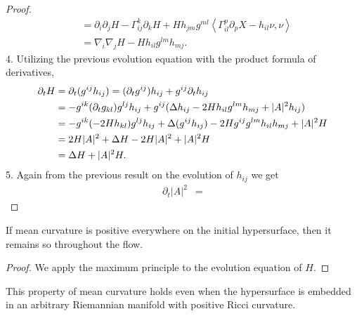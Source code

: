 \begin{proof}
\begin{align*}
& = \partial_{i}\partial_{j}H - \Gamma_{ij}^{k}\partial_{k}H + Hh_{jm}g^{ml}\left< \Gamma_{il}^{p}\partial_{p}X- h_{il}\nu, \nu \right> \\
& = \nabla_{i}\nabla_{j}H- Hh_{il}g^{lm}h_{mj}.
\end{align*}
4. Utilizing the previous evolution equation with the product formula of derivatives, 
\begin{align*}
\partial_t H &= \partial_t(g^{ij}h_{ij}) = (\partial_{t}g^{ij})h_{ij}+ g^{ij}\partial_{t}h_{ij}\\
& = -g^{ik}(\partial_{t}g_{kl})g^{lj}h_{ij}+ g^{ij}(\Delta h_{ij} - 2Hh_{il}g^{lm}h_{mj}+|A|^2h_{ij})\\
& = -g^{ik}(-2Hh_{kl})g^{lj}h_{ij}+ \Delta(g^{ij}h_{ij}) - 2Hg^{ij}g^{lm}h_{il}h_{mj}+|A|^2H\\
& = 2H|A|^2 + \Delta H - 2H|A|^2 + |A|^2H\\
& =  \Delta H+ |A|^2H.
\end{align*}
5. Again from the previous result on the evolution of $ h_{ij} $ we get \begin{align*}
    \partial_{t}|A|^{2} & = 
\end{align*}
\end{proof}
\begin{corollary}
If mean curvature is positive everywhere on the initial hypersurface, then it remains so throughout the flow.
\end{corollary}
\begin{proof}
We apply the maximum principle to the evolution equation of $H$.
\end{proof}
\begin{remark}
This property of mean curvature holds even when the hypersurface is embedded in an arbitrary Riemannian manifold with positive Ricci curvature. 
\end{remark}
